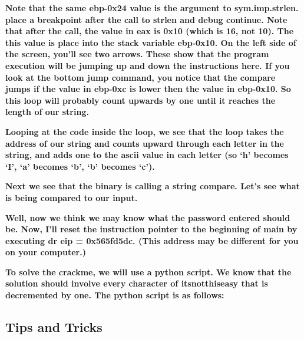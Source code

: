   
 

\textbf{Note that the same ebp-0x24 value is the argument to sym.imp.strlen. place a breakpoint after the call to strlen
and debug continue. Note that after the call, the value in eax is 0x10 (which is 16, not 10). The this value is place
into the stack variable ebp-0x10. On the left side of the screen, you'll see two arrows. These show that the program
execution will be jumping up and down the instructions here. If you look at the bottom jump command, you notice that
the compare jumps if the value in ebp-0xc is lower then the value in ebp-0x10. So this loop will probably count upwards
by one until it reaches the length of our string.}

  
 

\textbf{Looping at the code inside the loop, we see that the loop takes the address of our string and counts upward
through each letter in the string, and adds one to the ascii value in each letter (so `h' becomes `I', `a' becomes `b',
`b' becomes `c').}

  
 

\textbf{Next we see that the binary is calling a string compare. Let's see what is being compared to our input.}

  
 

\textbf{Well, now we think we may know what the password entered should be. Now, I'll reset the instruction pointer to
the beginning of main by executing dr eip = 0x565fd5dc. (This address may be different for you on your computer.)}

\textbf{To solve the crackme, we will use a python script. We know that the solution should involve every character of
itsnotthiseasy that is decremented by one. The python script is as follows:}

  
 

\subsection{Tips and Tricks}


